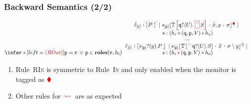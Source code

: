 \documentclass[12pt]{beamer}
\newcommand{\myctxr}[2]{{#1\left[\textcolor{black}{#2}\right]}}
\newcommand{\bkcolor}[1]{\textcolor{red}{#1}}
\newcommand{\sepcolor}[1]{\textcolor{magenta}{#1}}
\newcommand{\sred}[1]{\textcolor{myred}{#1}}
\newcommand{\bi}{\begin{enumerate}[$\bullet$]}
\newcommand{\ei}{\end{enumerate}}
\newcommand{\queue}[1]{\lfloor #1 \rfloor}
\newcommand{\store}{\sigma}
\newcommand{\ctx}[1]{\mathbb{#1}}
\newcommand{\rup}[2]{#1\setminus #2}
\newcommand{\mysepp}{\,\cdot\,}
\newcommand{\mytilde}[1]{\widetilde{#1}}
\newcommand{\codah}[4]{\coda{#1}{(#2\,\history\,#3)\!#4}}
\newcommand{\history}{\sepcolor{\mathbf{\star}}}
\newcommand{\coda}[2]{#1:#2}
\newcommand{\gpart}[1]{\mathtt{#1}}
\newcommand{\hmoni}[4]{\ensuremath{{#1\queue{\textcolor{black}{#2}\mysepp #3\mysepp #4}^{\normark}}}}
\newcommand{\monir}[4]{\ensuremath{{#1\queue{\textcolor{black}{#2}\mysepp #3\mysepp #4}^{\bkcolor{\rmark}}}}}
\newcommand{\past}{\,\text{\textcolor{red}{\textbf{\textasciicircum}}}\,}
\newcommand{\mypast}{\,\sred{\framebox[3mm]{\past}\,}}
\newcommand{\names}[1]{\mathtt{\mathbf{roles}}(#1)}
\newcommand{\conf}[2]{\lbag #2 \rbag} %
\newcommand{\stack}[1]{\mathtt{#1}}
\newcommand{\ltinp}[3]{\gpart{#1}?\langle#2\rangle.#3}
\newcommand{\inpses}{?}
\newcommand{\Par}{\;|\;}
\newcommand{\boundv}[1]{(#1)}
\newcommand{\shsep}{.}
\newcommand{\cons}{\circ}
\newcommand{\binp}[2]{#1 \inpses \boundv{#2} \shsep}
\newcommand{\bk}{\ensuremath{\bkcolor{\,\rightsquigarrow\,}}}
\newcommand{\p}{\ensuremath{\mathtt{p}}\xspace}
\newcommand{\q}{\ensuremath{\mathtt{q}}\xspace}
\newcommand{\er}{\ensuremath{\mathtt{r}}}
\newcommand{\ltinpp}[3]{\gpart{#1}?\langle#2\rangle.\mypast #3}
\newcommand{\key}[2]{#1_{[#2]}}
\newcommand{\np}[2]{#1:#2}
\newcommand{\ep}[2]{#1_{[#2]}}
\newcommand{\loc}{\ell}
\newcommand{\rmark}{\bkcolor{\blacklozenge}}
\newcommand{\normark}{\lozenge}
\begin{document}
\begin{frame}
\frametitle{Backward Semantics (2/2)}
%
 
$$
\infer*[left=\bkcolor{(ROut)}]{\p = \er \,\vee\, \p \in \names{\er, h_i}
}{
{\begin{tabular}[b]{c}
$\np{\key{\loc}{\er}}{\conf{\stack C}{P}} \Par 
\monir{\ep{s}{\p}}{ \myctxr{\ctx T} {\ltinpp{\q}{U}{S}} }{\mytilde x,y}{\store} \Par 
$
\\
$\codah{s}{h_i\cons(\q,\p,V)}{h_o}{}$
 \\ 
 \bk 
 \\
$\np{\key{\loc}{\er}}{\conf{\stack C} { \binp{\ep{s}{\p}}{y}{P}} }
 \Par 
\hmoni{\ep{s}{\p}}{ \myctxr{\ctx T}{\past\ltinp{\q}{U}{S}}}{\mytilde x}{\rup{\store}{y}}\Par $
\\
$\codah{s}{h_i}{(\q,\p,V)\cons h_o}{}$
\end{tabular}}
}
$$


\bi
	\item Rule~\textsc{RIn} is symmetric to Rule~\textsc{In} and only enabled when the monitor is tagged as $\rmark$
	\item Other rules for $\bk$ are as expected
\ei

\end{frame}
\end{document}
